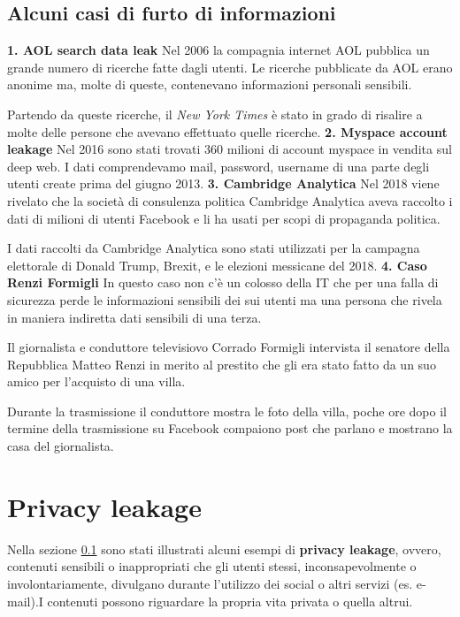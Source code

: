 \subsection{Alcuni casi di furto di informazioni}
\label{ssec:exampleLeak}
\textbf{1. AOL search data leak}\cite{aolDataLeak}\newline
Nel 2006 la compagnia internet AOL pubblica un grande numero di ricerche fatte dagli utenti. Le ricerche pubblicate da AOL erano anonime ma, molte di queste, contenevano informazioni personali sensibili.

Partendo da queste ricerche, il \textit{New York Times} è stato in grado di risalire a molte delle persone che avevano effettuato quelle ricerche.\newline
\textbf{2. Myspace account leakage}\cite{myspacebreach}\newline
Nel 2016 sono stati trovati 360 milioni di account myspace in vendita sul deep web. I dati comprendevamo mail, password, username di una parte degli utenti create prima del giugno 2013.\newline
\textbf{3. Cambridge Analytica}\cite{cambridge}\newline
Nel 2018 viene rivelato che la società di consulenza politica Cambridge Analytica aveva raccolto i dati di milioni di utenti Facebook e li ha usati per scopi di propaganda politica.

I dati raccolti da Cambridge Analytica sono stati utilizzati per la campagna elettorale di Donald Trump, Brexit, e le elezioni messicane del 2018.\newline
\textbf{4. Caso Renzi Formigli}\cite{formigli}\newline
In questo caso non c'è un colosso della IT che per una falla di sicurezza perde le informazioni sensibili dei sui utenti ma una persona che rivela in maniera indiretta dati sensibili di una terza.

Il giornalista e conduttore televisiovo Corrado Formigli intervista il senatore della Repubblica Matteo Renzi in merito al prestito che gli era stato fatto da un suo amico per l’acquisto di una villa.


Durante la trasmissione il conduttore mostra le foto della villa, poche ore dopo il termine della trasmissione su Facebook compaiono post che parlano e mostrano la casa del giornalista.

\section{Privacy leakage}
\label{sec:privacyLeakage}
Nella sezione \ref{ssec:exampleLeak} sono stati illustrati alcuni esempi di \textbf{privacy leakage}, ovvero, contenuti sensibili o inappropriati che gli utenti stessi, inconsapevolmente o involontariamente, divulgano durante l'utilizzo dei social o altri servizi (es. e-mail).I contenuti possono riguardare la propria vita privata o quella altrui.

